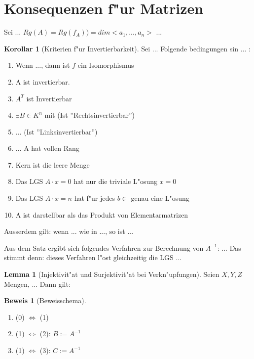 \documentclass[oneside,fontsize=11pt,paper=a4,BCOR=0mm,DIV=12,automark,headsepline]{scrbook}
\theoremstyle{remark}
\theoremstyle{definition}
\newtheorem{lemma}{Lemma}[section]
\newtheorem*{korollar}{Korollar}
\theoremstyle{definition}
\newtheorem*{prof}{Beweis}
\theoremstyle{remark}
\begin{document}
\section{Konsequenzen f"ur Matrizen}
\label{sec:konsma}

Sei ...
$Rg(A)=Rg(f_A))=dim<a_1,...,a_n>$ ...

\begin{korollar}[Kriterien f"ur Invertierbarkeit]
  Sei ... Folgende bedingungen sin ... :
  \begin{enumerate}
  \item Wenn ..., dann ist $f$ ein Isomorphismus
  \item A ist invertierbar.
  \item $A^T$ ist Invertierbar
  \item $\exists B\in K^n$ mit (Ist ''Rechtsinvertierbar'')
  \item ... (Ist ''Linksinvertierbar'')
  \item ... A hat vollen Rang
  \item Kern ist die leere Menge
  \item Das LGS $A\cdot x = 0$ hat nur die triviale L"osung $x=0$
  \item Das LGS $A\cdot x = n$ hat f"ur jedes $b\in $ genau eine L"osung
  \item A ist darstellbar als das Produkt von Elementarmatrizen
  \end{enumerate}

  Ausserdem gilt: wenn ... wie in ..., so ist ... 
\end{korollar}

Aus dem Satz ergibt sich folgendes Verfahren zur Berechnung von $A^{-1}$: ...
Das stimmt denn: dieses Verfahren l"ost gleichzeitig die LGS ...

\begin{lemma}[Injektivit"at und Surjektivit"at bei Verkn"upfungen]
  Seien $X,Y,Z$ Mengen, ... Dann gilt:  
\end{lemma}

\begin{prof}[Beweisschema]
  \begin{enumerate}
  \item (0) $ \iff $ (1)
  \item (1) $ \iff $ (2): $B:=A^{-1}$
  \item (1) $ \iff $ (3): $C:=A^{-1}$
  \end{enumerate}
\end{prof}
\end{document}
